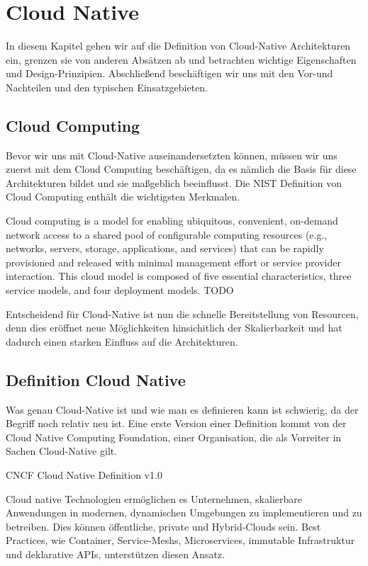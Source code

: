 \chapter{Cloud Native}

In diesem Kapitel gehen wir auf die Definition von Cloud-Native Architekturen ein, grenzen sie von anderen Absätzen ab und betrachten wichtige Eigenschaften und Design-Prinzipien. Abschließend beschäftigen wir uns mit den Vor-und Nachteilen und den typischen Einsatzgebieten.

\section{Cloud Computing}
Bevor wir uns mit Cloud-Native auseinandersetzten können, müssen wir uns zuerst mit dem Cloud Computing beschäftigen, da es nämlich die Basis für diese Architekturen bildet und sie maßgeblich beeinflusst. Die NIST Definition von Cloud Computing enthält die wichtigsten Merkmalen.

Cloud computing is a model for enabling ubiquitous, convenient, on-demand network access to a shared pool of configurable computing resources (e.g., networks, servers, storage, applications, and services) that can be rapidly provisioned and released with minimal management effort or service provider interaction. This cloud model is composed of five essential characteristics, three service models, and four deployment models. TODO

Entscheidend für Cloud-Native ist nun die schnelle Bereitstellung von Resourcen, denn dies eröffnet neue Möglichkeiten hinsichitlich der Skalierbarkeit und hat dadurch einen starken Einfluss auf die Architekturen.

\section{Definition Cloud Native}
Was genau Cloud-Native ist und wie man es definieren kann ist schwierig, da der Begriff noch relativ neu ist. Eine erste Version einer Definition kommt von der Cloud Native Computing Foundation, einer Organisation, die als Vorreiter in Sachen Cloud-Native gilt.

CNCF Cloud Native Definition v1.0

Cloud native Technologien ermöglichen es Unternehmen, skalierbare Anwendungen in modernen, dynamischen Umgebungen zu implementieren und zu betreiben. Dies können öffentliche, private und Hybrid-Clouds sein. Best Practices, wie Container, Service-Meshs, Microservices, immutable Infrastruktur und deklarative APIs, unterstützen diesen Ansatz.

